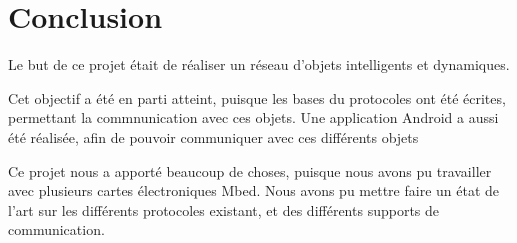 \chapter*{Conclusion}

Le but de ce projet était de réaliser un réseau d'objets intelligents et dynamiques.

Cet objectif a été en parti atteint, puisque les bases du protocoles ont été écrites, permettant la 
commnunication avec ces objets. Une application Android a aussi été réalisée, afin de pouvoir communiquer 
avec ces différents objets

Ce projet nous a apporté beaucoup de choses, puisque nous avons pu travailler avec plusieurs cartes 
électroniques Mbed. Nous avons pu mettre faire un état de l'art sur les différents protocoles existant, et 
des différents supports de communication.